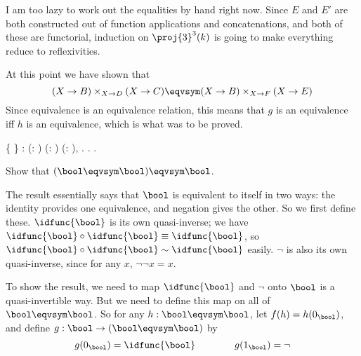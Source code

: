 I am too lazy to work out the equalities by hand right now.  Since $E$ and $E'$
are both constructed out of function applications and concatenations, and both
of these are functorial, induction on $\proj{3}^{3}(k)$ is going to make
everything reduce to reflexivities.


At this point we have shown that
\[
  (X \to B) \times_{X \to D} (X \to C)
  \eqvsym
  (X \to B) \times_{X \to F} (X \to E)
\]
Since equivalence is an equivalence relation, this means that $g$ is an
equivalence iff $h$ is an equivalence, which is what was to be proved.
\begin{coqdoccode}
\coqdocemptyline
\coqdocnoindent
{}  \{   \} : \coqdockw{\ensuremath{\forall}} (:   ) (:   ) (:   ),\coqdoceol
\coqdocindent{1.00em}
  \coqdocnotation{(}  \coqdocnotation{)} \coqdocnotation{=} \coqdocnotation{(}  \coqdocnotation{)}  .\coqdoceol
\coqdocindent{1.00em}
. .\coqdoceol
\coqdocemptyline
\coqdocemptyline
\end{coqdoccode}
Show that $(\bool \eqvsym \bool) \eqvsym \bool$.


 \soln
The result essentially says that $\bool$ is equivalent to itself in two ways:
the identity provides one equivalence, and negation gives the other.  So we
first define these.  $\idfunc{\bool}$ is its own quasi-inverse; we have
$\idfunc{\bool} \circ \idfunc{\bool} \equiv \idfunc{\bool}$, so $\idfunc{\bool}
\circ \idfunc{\bool}
\sim \idfunc{\bool}$ easily.  $\lnot$ is also its own quasi-inverse, since for
any $x$, $\lnot\lnot x = x$.


To show the result, we need to map $\idfunc{\bool}$ and $\lnot$ onto $\bool$ is
a quasi-invertible way.  But we need to define this map on all of $\bool
\eqvsym \bool$.  So for any $h : \bool\eqvsym\bool$, let $f(h) = h(0_{\bool})$,
and define $g : \bool \to (\bool \eqvsym \bool)$ by
\[
  g(0_{\bool}) = \idfunc{\bool} 
  \qquad\qquad
  g(1_{\bool}) = \lnot
\]



